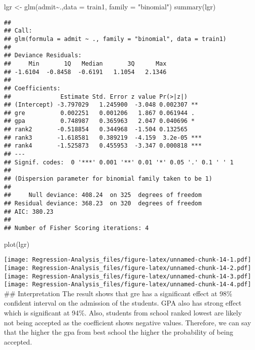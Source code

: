 \documentclass[
]{article}
\newenvironment{Shaded}{\begin{snugshade}}{\end{snugshade}}
\newcommand{\AttributeTok}[1]{\textcolor[rgb]{0.77,0.63,0.00}{#1}}
\newcommand{\FunctionTok}[1]{\textcolor[rgb]{0.00,0.00,0.00}{#1}}
\newcommand{\NormalTok}[1]{#1}
\newcommand{\OtherTok}[1]{\textcolor[rgb]{0.56,0.35,0.01}{#1}}
\newcommand{\SpecialCharTok}[1]{\textcolor[rgb]{0.00,0.00,0.00}{#1}}
\newcommand{\StringTok}[1]{\textcolor[rgb]{0.31,0.60,0.02}{#1}}
\begin{document}
\begin{Shaded}
\begin{Highlighting}[]
\NormalTok{lgr }\OtherTok{\textless{}{-}} \FunctionTok{glm}\NormalTok{(admit}\SpecialCharTok{\textasciitilde{}}\NormalTok{.,}\AttributeTok{data =}\NormalTok{ train1, }\AttributeTok{family =} \StringTok{"binomial"}\NormalTok{)}
\FunctionTok{summary}\NormalTok{(lgr)}
\end{Highlighting}
\end{Shaded}

\begin{verbatim}
## 
## Call:
## glm(formula = admit ~ ., family = "binomial", data = train1)
## 
## Deviance Residuals: 
##     Min       1Q   Median       3Q      Max  
## -1.6104  -0.8458  -0.6191   1.1054   2.1346  
## 
## Coefficients:
##              Estimate Std. Error z value Pr(>|z|)    
## (Intercept) -3.797029   1.245900  -3.048 0.002307 ** 
## gre          0.002251   0.001206   1.867 0.061944 .  
## gpa          0.748987   0.365963   2.047 0.040696 *  
## rank2       -0.518854   0.344968  -1.504 0.132565    
## rank3       -1.618581   0.389219  -4.159  3.2e-05 ***
## rank4       -1.525873   0.455953  -3.347 0.000818 ***
## ---
## Signif. codes:  0 '***' 0.001 '**' 0.01 '*' 0.05 '.' 0.1 ' ' 1
## 
## (Dispersion parameter for binomial family taken to be 1)
## 
##     Null deviance: 408.24  on 325  degrees of freedom
## Residual deviance: 368.23  on 320  degrees of freedom
## AIC: 380.23
## 
## Number of Fisher Scoring iterations: 4
\end{verbatim}

\begin{Shaded}
\begin{Highlighting}[]
\FunctionTok{plot}\NormalTok{(lgr)}
\end{Highlighting}
\end{Shaded}

\texttt{[image: Regression-Analysis\_files/figure-latex/unnamed-chunk-14-1.pdf]}
\texttt{[image: Regression-Analysis\_files/figure-latex/unnamed-chunk-14-2.pdf]}
\texttt{[image: Regression-Analysis\_files/figure-latex/unnamed-chunk-14-3.pdf]}
\texttt{[image: Regression-Analysis\_files/figure-latex/unnamed-chunk-14-4.pdf]}
\#\# Interpretation The result shows that gre has a significant effect
at 98\% confident interval on the admission of the students. GPA also
has strong effect which is significant at 94\%. Also, students from
school ranked lowest are likely not being accepted as the coefficient
shows negative values. Therefore, we can say that the higher the gpa
from best school the higher the probability of being accepted.
\end{document}
